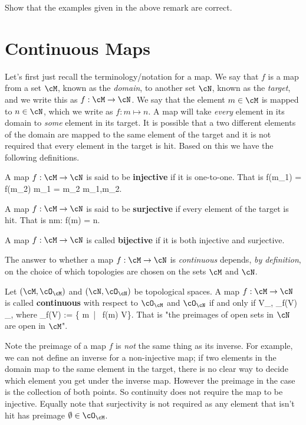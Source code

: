 \bbox
    Show that the examples given in the above remark are correct. 
\ebox 

\section{Continuous Maps}

Let's first just recall the terminology/notation for a map. We say that $f$ is a map from a set $\cM$, known as the \textit{domain}, to another set $\cN$, known as the \textit{target}, and we write this as $f:\cM\to\cN$. We say that the element $m\in\cM$ is mapped to $n\in\cN$, which we write as $f:m\mapsto n$. A map will take \textit{every} element in its domain to \textit{some} element in its target. It is possible that a two different elements of the domain are mapped to the same element of the target and it is not required that every element in the target is hit. Based on this we have the following definitions. 

    A map $f:\cM\to\cN$ is said to be \textbf{injective} if it is one-to-one. That is 
    \bse 
        f(m_1) = f(m_2) \iff m_1 = m_2 \qquad \forall m_1,m_2\in\cM.
    \ese 
\ed 

    A map $f:\cM\to\cN$ is said to be \textbf{surjective} if every element of the target is hit. That is 
    \bse 
        \forall n\in\cN \quad  \exists m\in\cM : f(m) = n. 
    \ese 
\ed 

    A map $f:\cM\to\cN$ is called \textbf{bijective} if it is both injective and surjective. 
\ed 

The answer to whether a map $f:\cM\to\cN$ is \textit{continuous} depends, \textit{by definition}, on the choice of which topologies are chosen on the sets $\cM$ and $\cN$. 

    Let $(\cM,\cO_{\cM})$ and $(\cN,\cO_{\cN})$ be topological spaces. A map $f:\cM\to\cN$ is called \textbf{continuous} with respect to $\cO_{\cM}$ and $\cO_{\cN}$ if and only if 
    \bse 
        \forall V\in\cO_{\cN}, \qquad \preim_{f}(V) \in\cO_{\cM},
    \ese 
    where 
    \bse 
        \preim_f(V) := \{ m\in\cM \, | \, f(m) \in V\}.
    \ese 
    That is "the preimages of open sets in $\cN$ are open in $\cM$".
\ed 
 
\br 
    Note the preimage of a map $f$ is \textit{not} the same thing as its inverse. For example, we can not define an inverse for a non-injective map; if two elements in the domain map to the same element in the target, there is no clear way to decide which element you get under the inverse map. However the preimage in the case is the collection of both points. So continuity does not require the map to be injective. Equally note that surjectivity is not required as any element that isn't hit has preimage $\emptyset\in\cO_{\cM}$. 
\er 

